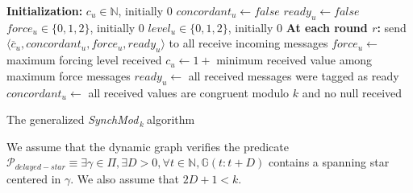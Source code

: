 \documentclass[11pt,letterpaper]{article}
\newcommand{\cent}{\gamma}
\newcommand{\SM}{{\em SynchMod}$_{\,k}\ $}
\begin{document}
\begin{algorithm}[htb]
	\DontPrintSemicolon
	\textbf{Initialization:} \;
	\Indp
		$c_u \in \mathds{N}$, initially 0 \;
		$concordant_u \leftarrow false$ \;
		$ready_u \leftarrow false$ \;
		$force_u \in \{0, 1, 2\}$, initially 0 \;
		$level_u \in \{0, 1, 2\}$, initially 0 \;
	\BlankLine
	\Indm
	\textbf{At each round $r$:} \;
	\Indp
		send $\langle \overline{c}_u, concordant_u, force_u, ready_u \rangle$ to all  \;
		receive incoming messages \;
		$force_u \leftarrow$ maximum forcing level received \;\label{line:force}
		$c_u \leftarrow 1+$ minimum received value among maximum force messages \;\label{line:min-z-end} 
		$ready_u \leftarrow$ all received messages were tagged as ready \; \label{line:ready-gossip} 
		$concordant_u \leftarrow$ all received values are congruent modulo $k$ and no null received \; \label{line:conc-gossip}
	\Indm
\caption{The generalized \SM algorithm} 
\end{algorithm}

We assume that the dynamic graph verifies the predicate $\mathcal{P}_{delayed-star} \equiv \exists \cent \in \Pi, \exists D > 0, \forall t \in \mathds{N}, \mathds{G}(t:t+D)$
contains a spanning star centered in $\cent$. We also assume that $2D+1 < k$.
\end{document}

